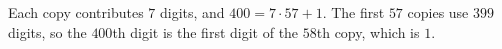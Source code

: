 Each copy contributes $7$ digits, and $400=7\cdot57+1$. The first $57$ copies use $399$ digits, so the $400$th digit is the first digit of the $58$th copy, which is $\boxed{1}$.
